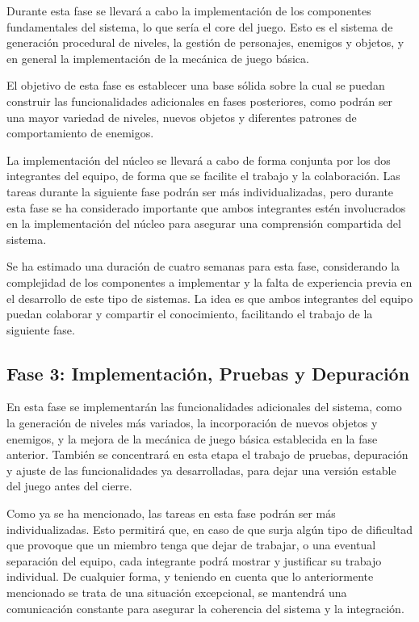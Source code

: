 Durante esta fase se llevará a cabo la implementación de los componentes fundamentales del sistema,
lo que sería el core del juego. Esto es el sistema de generación procedural de niveles, la gestión 
de personajes, enemigos y objetos, y en general la implementación de la mecánica de juego básica.

El objetivo de esta fase es establecer una base sólida sobre la cual se puedan construir las funcionalidades
adicionales en fases posteriores, como podrán ser una mayor variedad de niveles, nuevos objetos y diferentes
patrones de comportamiento de enemigos.

La implementación del núcleo se llevará a cabo de forma conjunta por los dos integrantes del equipo,
de forma que se facilite el trabajo y la colaboración. Las tareas durante la siguiente fase podrán
ser más individualizadas, pero durante esta fase se ha considerado importante que ambos integrantes 
estén involucrados en la implementación del núcleo para asegurar una comprensión compartida del sistema. 

Se ha estimado una duración de cuatro semanas para esta fase, considerando la complejidad de los
componentes a implementar y la falta de experiencia previa en el desarrollo de este tipo de sistemas.
La idea es que ambos integrantes del equipo puedan colaborar y compartir el conocimiento, facilitando
el trabajo de la siguiente fase.

\subsection{Fase 3: Implementación, Pruebas y Depuración}

En esta fase se implementarán las funcionalidades adicionales del sistema, como la generación de niveles 
más variados, la incorporación de nuevos objetos y enemigos, y la mejora de la mecánica de juego básica 
establecida en la fase anterior. También se concentrará en esta etapa el trabajo de pruebas, depuración y 
ajuste de las funcionalidades ya desarrolladas, para dejar una versión estable del juego antes del cierre.

Como ya se ha mencionado, las tareas en esta fase podrán ser más individualizadas. Esto permitirá
que, en caso de que surja algún tipo de dificultad que provoque que un miembro tenga que dejar
de trabajar, o una eventual separación del equipo, cada integrante podrá mostrar y justificar
su trabajo individual. De cualquier forma, y teniendo en cuenta que lo anteriormente mencionado
se trata de una situación excepcional, se mantendrá una comunicación constante para asegurar 
la coherencia del sistema y la integración.

